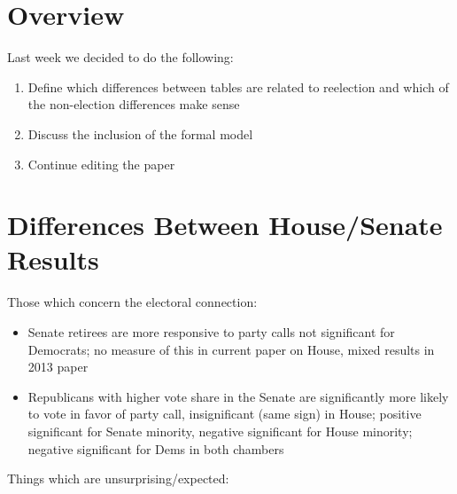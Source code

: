 \documentclass[12pt]{article}
\begin{document}
\section{Overview}

Last week we decided to do the following:

\begin{enumerate}
	\item Define which differences between tables are related to reelection and which of the non-election differences make sense
	
	\item Discuss the inclusion of the formal model
	
	\item Continue editing the paper
\end{enumerate}

\section{Differences Between House/Senate Results}

Those which concern the electoral connection:

\begin{itemize}
	
	\item Senate retirees are more responsive to party calls not significant for Democrats; no measure of this in current paper on House, mixed results in 2013 paper 
	
	\item Republicans with higher vote share in the Senate are significantly more likely to vote in favor of party call, insignificant (same sign) in House; positive significant for Senate minority, negative significant for House minority; negative significant for Dems in both chambers
	
\end{itemize}

\noindent
Things which are unsurprising/expected:
\end{document}
